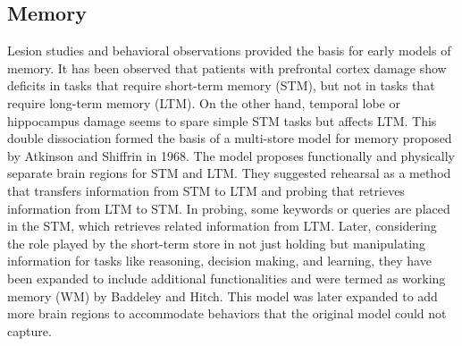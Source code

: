 \documentclass[reprint,amsmath,amssymb,apr,aip,onecolumn, 11pt]{revtex4-1}
\begin{document}
 

\subsection{Memory}


Lesion studies and behavioral observations provided the basis for early models of memory. It has been observed that patients with prefrontal cortex damage show deficits in tasks that require short-term memory (STM), but not in tasks that require long-term memory (LTM). On the other hand, temporal lobe or hippocampus damage seems to spare simple STM tasks but affects LTM. This double dissociation formed the basis of a multi-store model for memory proposed by Atkinson and Shiffrin\cite{ATKINSON1968, Atkinson_1971} in 1968. The model proposes functionally and physically separate brain regions for STM and LTM.  They suggested rehearsal as a method that transfers information from STM to LTM and probing that retrieves information from LTM to STM. In probing, some keywords or queries are placed in the STM, which retrieves related information from LTM. Later, considering the role played by the short-term store in not just holding but manipulating information for tasks like reasoning, decision making, and learning, they have been expanded to include additional functionalities and were termed as working memory (WM) by Baddeley and Hitch\cite{BADDELEY1974}.  This model was later expanded to add more brain regions to accommodate behaviors that the original model could not capture\cite{Baddeley_2000}. 
\end{document}
